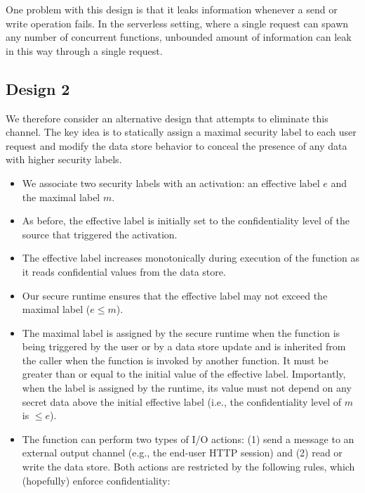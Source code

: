 One problem with this design is that it leaks information whenever a 
send or write operation fails.  In the serverless setting, where a 
single request can spawn any number of concurrent functions, unbounded 
amount of information can leak in this way through a single request.

\subsection{Design 2}

We therefore consider an alternative design that attempts to eliminate 
this channel. The key idea is to statically assign a maximal security 
label to each user request and modify the data store behavior to 
conceal the presence of any data with higher security labels.

\begin{itemize}
    \item We associate two security labels with an activation: an 
        effective label $e$ and the maximal label $m$.

    \item As before, the effective label is initially set to the 
        confidentiality level of the source that triggered the 
        activation.

    \item The effective label increases monotonically during execution 
        of the function as it reads confidential values from the data 
        store.

    \item Our secure runtime ensures that the effective label may not 
        exceed the maximal label ($e \leq m$).

    \item The maximal label is assigned by the secure runtime when the 
        function is being triggered by the user or by a data store 
        update and is inherited from the caller when the function is 
        invoked by another function. It must be greater than or equal 
        to the initial value of the effective label.  Importantly, 
        when the label is assigned by the runtime, its value must not 
        depend on any secret data above the initial effective label 
        (i.e., the confidentiality level of $m$ is $\leq e$).

    \item The function can perform two types of I/O actions: (1) send 
        a message to an external output channel (e.g., the end-user 
        HTTP session) and (2) read or write the data store.  Both 
        actions are restricted by the following rules, which 
        (hopefully) enforce confidentiality:


\end{itemize}
